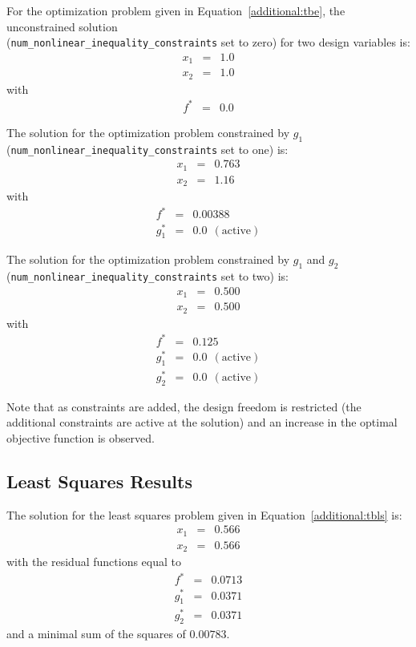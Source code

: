 For the optimization problem given in Equation~\ref{additional:tbe}, the
unconstrained solution\\(\texttt{num\_nonlinear\_inequality\_constraints} 
set to zero) for two design variables is:
\begin{eqnarray*}
    x_1 &=& 1.0 \\
    x_2 &=& 1.0
\end{eqnarray*}
with
\begin{eqnarray*}
    f^{\ast} &=& 0.0
\end{eqnarray*}

The solution for the optimization problem constrained by $g_1$\\
(\texttt{num\_nonlinear\_inequality\_constraints} set to one) is:
\begin{eqnarray*}
    x_1 &=& 0.763 \\
    x_2 &=& 1.16
\end{eqnarray*}
with
\begin{eqnarray*}
      f^{\ast} &=& 0.00388 \\
    g_1^{\ast} &=& 0.0 ~~\mathrm{(active)}
\end{eqnarray*}

The solution for the optimization problem constrained by $g_1$ and $g_2$\\
(\texttt{num\_nonlinear\_inequality\_constraints} set to two) is:
\begin{eqnarray*}
    x_1 &=& 0.500 \\
    x_2 &=& 0.500
\end{eqnarray*}
with
\begin{eqnarray*}
      f^{\ast} &=& 0.125 \\
    g_1^{\ast} &=& 0.0 ~~\mathrm{(active)} \\
    g_2^{\ast} &=& 0.0 ~~\mathrm{(active)}
\end{eqnarray*}

Note that as constraints are added, the design freedom is restricted
(the additional constraints are active at the solution) and an
increase in the optimal objective function is observed.

\subsection{Least Squares Results}\label{additional:textbook:least}

The solution for the least squares problem given in 
Equation~\ref{additional:tbls} is:
\begin{eqnarray*}
    x_1 &=& 0.566 \\
    x_2 &=& 0.566
\end{eqnarray*}
with the residual functions equal to
\begin{eqnarray*}
      f^{\ast} &=& 0.0713 \\
    g_1^{\ast} &=& 0.0371 \\
    g_2^{\ast} &=& 0.0371
\end{eqnarray*}
and a minimal sum of the squares of $0.00783$.

